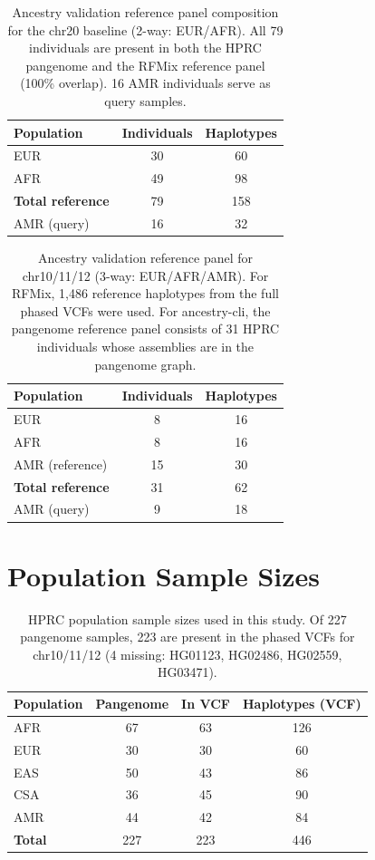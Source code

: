 \documentclass[11pt]{article}
\begin{document}
\begin{table}[ht]
\centering
\caption{Ancestry validation reference panel composition for the chr20 baseline (2-way: EUR/AFR). All 79 individuals are present in both the HPRC pangenome and the RFMix reference panel (100\% overlap). 16 AMR individuals serve as query samples.}
\label{tab:ref_panel}
\begin{tabular}{lcc}
\hline
\textbf{Population} & \textbf{Individuals} & \textbf{Haplotypes} \\
\hline
EUR & 30 & 60 \\
AFR & 49 & 98 \\
\hline
\textbf{Total reference} & 79 & 158 \\
AMR (query) & 16 & 32 \\
\hline
\end{tabular}
\end{table}

\begin{table}[ht]
\centering
\caption{Ancestry validation reference panel for chr10/11/12 (3-way: EUR/AFR/AMR). For RFMix, 1,486 reference haplotypes from the full phased VCFs were used. For ancestry-cli, the pangenome reference panel consists of 31 HPRC individuals whose assemblies are in the pangenome graph.}
\label{tab:ref_panel_3way}
\begin{tabular}{lcc}
\hline
\textbf{Population} & \textbf{Individuals} & \textbf{Haplotypes} \\
\hline
EUR & 8 & 16 \\
AFR & 8 & 16 \\
AMR (reference) & 15 & 30 \\
\hline
\textbf{Total reference} & 31 & 62 \\
AMR (query) & 9 & 18 \\
\hline
\end{tabular}
\end{table}

\section{Population Sample Sizes}
\label{sec:supp_samples}

\begin{table}[ht]
\centering
\caption{HPRC population sample sizes used in this study. Of 227 pangenome samples, 223 are present in the phased VCFs for chr10/11/12 (4 missing: HG01123, HG02486, HG02559, HG03471).}
\label{tab:sample_sizes}
\begin{tabular}{lccc}
\hline
\textbf{Population} & \textbf{Pangenome} & \textbf{In VCF} & \textbf{Haplotypes (VCF)} \\
\hline
AFR & 67 & 63 & 126 \\
EUR & 30 & 30 & 60 \\
EAS & 50 & 43 & 86 \\
CSA & 36 & 45 & 90 \\
AMR & 44 & 42 & 84 \\
\hline
\textbf{Total} & 227 & 223 & 446 \\
\hline
\end{tabular}
\end{table}
\end{document}
